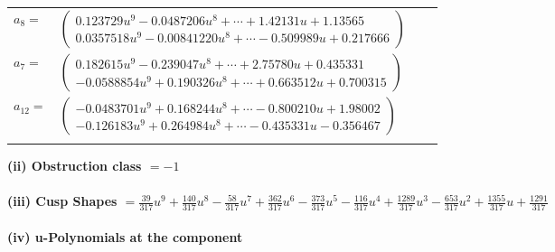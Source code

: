 \documentclass[1p]{elsarticle_modified}
\theoremstyle{definition}
\begin{document}
\begin{tabular}{m{7pt} m{180pt} m{7pt} m{180pt} }
\flushright $a_{8}=$&$\begin{pmatrix}0.123729 u^{9}-0.0487206 u^{8}+\cdots+1.42131 u+1.13565\\0.0357518 u^{9}-0.00841220 u^{8}+\cdots-0.509989 u+0.217666\end{pmatrix}$ \\
\flushright $a_{7}=$&$\begin{pmatrix}0.182615 u^{9}-0.239047 u^{8}+\cdots+2.75780 u+0.435331\\-0.0588854 u^{9}+0.190326 u^{8}+\cdots+0.663512 u+0.700315\end{pmatrix}$ \\
\flushright $a_{12}=$&$\begin{pmatrix}-0.0483701 u^{9}+0.168244 u^{8}+\cdots-0.800210 u+1.98002\\-0.126183 u^{9}+0.264984 u^{8}+\cdots-0.435331 u-0.356467\end{pmatrix}$\\&\end{tabular}
\flushleft \textbf{(ii) Obstruction class $= -1$}\\~\\
\flushleft \textbf{(iii) Cusp Shapes $= \frac{39}{317} u^9+\frac{140}{317} u^8-\frac{58}{317} u^7+\frac{362}{317} u^6-\frac{373}{317} u^5-\frac{116}{317} u^4+\frac{1289}{317} u^3-\frac{653}{317} u^2+\frac{1355}{317} u+\frac{1291}{317}$}\\~\\
\newpage\renewcommand{\arraystretch}{1}
\flushleft \textbf{(iv) u-Polynomials at the component}\newline \\
\end{document}
